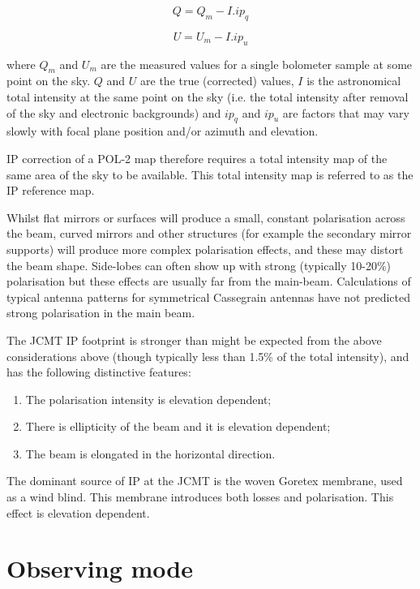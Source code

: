 \begin{equation}
Q = Q_{m} - I. ip_{q}
\end{equation}

\begin{equation}
U = U_{m} - I. ip_{u}
\end{equation}

where $Q_{m}$ and $U_{m}$ are the measured values for a single
bolometer sample at some point on the sky. $Q$ and $U$ are the true
(corrected) values, $I$ is the astronomical total intensity at the same
point on the sky (i.e. the total intensity after removal of the sky
and electronic backgrounds) and $ip_{q}$ and $ip_{u}$ are factors that
may vary slowly with focal plane position and/or azimuth and
elevation.

IP correction of a POL-2 map therefore requires a total
intensity map of the same area of the sky to be available. This total
intensity map is referred to as the IP reference map.

Whilst flat mirrors or surfaces will produce a small, constant
polarisation across the beam, curved mirrors and other structures (for
example the secondary mirror supports) will produce more complex
polarisation effects, and these may distort the beam shape.
Side-lobes can often show up with strong (typically 10-20\%)
polarisation but these effects are usually far from the
main-beam. Calculations of typical antenna patterns for symmetrical
Cassegrain antennas have not predicted strong polarisation in the main
beam.

The JCMT IP footprint is stronger than might be expected from the
above considerations above (though typically less than 1.5\% of the
total intensity), and has the following distinctive features:

\begin{enumerate}
\item The polarisation intensity is elevation dependent;
\item There is ellipticity of the beam and it is elevation dependent;
\item The beam is elongated in the horizontal direction.
\end{enumerate}

The dominant source of IP at the JCMT is the woven Goretex membrane,
used as a wind blind.  This membrane introduces both losses and
polarisation. This effect is elevation dependent.


\section{Observing mode}
\label{sec:mmodes}

